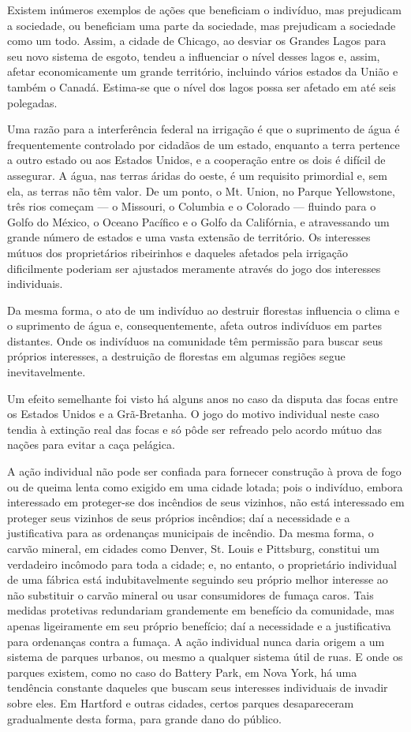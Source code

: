 \documentclass[12pt]{article}
\begin{document}
Existem inúmeros exemplos de ações que beneficiam o indivíduo, mas prejudicam a sociedade, ou beneficiam uma parte da sociedade, mas prejudicam a sociedade como um todo. Assim, a cidade de Chicago, ao desviar os Grandes Lagos para seu novo sistema de esgoto, tendeu a influenciar o nível desses lagos e, assim, afetar economicamente um grande território, incluindo vários estados da União e também o Canadá. Estima-se que o nível dos lagos possa ser afetado em até seis polegadas.

Uma razão para a interferência federal na irrigação é que o suprimento de água é frequentemente controlado por cidadãos de um estado, enquanto a terra pertence a outro estado ou aos Estados Unidos, e a cooperação entre os dois é difícil de assegurar. A água, nas terras áridas do oeste, é um requisito primordial e, sem ela, as terras não têm valor. De um ponto, o Mt. Union, no Parque Yellowstone, três rios começam — o Missouri, o Columbia e o Colorado — fluindo para o Golfo do México, o Oceano Pacífico e o Golfo da Califórnia, e atravessando um grande número de estados e uma vasta extensão de território. Os interesses mútuos dos proprietários ribeirinhos e daqueles afetados pela irrigação dificilmente poderiam ser ajustados meramente através do jogo dos interesses individuais.

Da mesma forma, o ato de um indivíduo ao destruir florestas influencia o clima e o suprimento de água e, consequentemente, afeta outros indivíduos em partes distantes. Onde os indivíduos na comunidade têm permissão para buscar seus próprios interesses, a destruição de florestas em algumas regiões segue inevitavelmente.

Um efeito semelhante foi visto há alguns anos no caso da disputa das focas entre os Estados Unidos e a Grã-Bretanha. O jogo do motivo individual neste caso tendia à extinção real das focas e só pôde ser refreado pelo acordo mútuo das nações para evitar a caça pelágica.

A ação individual não pode ser confiada para fornecer construção à prova de fogo ou de queima lenta como exigido em uma cidade lotada; pois o indivíduo, embora interessado em proteger-se dos incêndios de seus vizinhos, não está interessado em proteger seus vizinhos de seus próprios incêndios; daí a necessidade e a justificativa para as ordenanças municipais de incêndio. Da mesma forma, o carvão mineral, em cidades como Denver, St. Louis e Pittsburg, constitui um verdadeiro incômodo para toda a cidade; e, no entanto, o proprietário individual de uma fábrica está indubitavelmente seguindo seu próprio melhor interesse ao não substituir o carvão mineral ou usar consumidores de fumaça caros. Tais medidas protetivas redundariam grandemente em benefício da comunidade, mas apenas ligeiramente em seu próprio benefício; daí a necessidade e a justificativa para ordenanças contra a fumaça. A ação individual nunca daria origem a um sistema de parques urbanos, ou mesmo a qualquer sistema útil de ruas. E onde os parques existem, como no caso do Battery Park, em Nova York, há uma tendência constante daqueles que buscam seus interesses individuais de invadir sobre eles. Em Hartford e outras cidades, certos parques desapareceram gradualmente desta forma, para grande dano do público.
\end{document}
